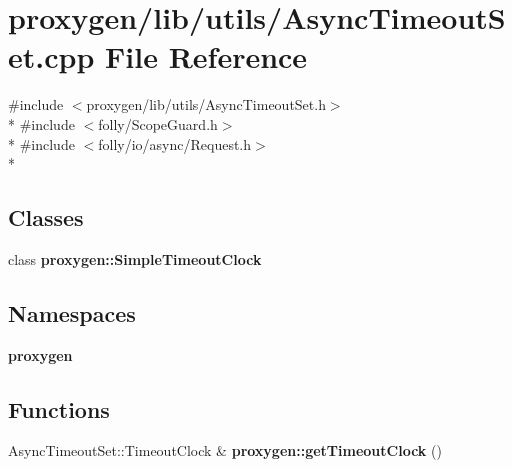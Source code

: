 \section{proxygen/lib/utils/\+Async\+Timeout\+Set.cpp File Reference}
\label{AsyncTimeoutSet_8cpp}
{\ttfamily \#include $<$proxygen/lib/utils/\+Async\+Timeout\+Set.\+h$>$}\\*
{\ttfamily \#include $<$folly/\+Scope\+Guard.\+h$>$}\\*
{\ttfamily \#include $<$folly/io/async/\+Request.\+h$>$}\\*
\subsection*{Classes}
\begin{DoxyCompactItemize}
\item 
class {\bf proxygen\+::\+Simple\+Timeout\+Clock}
\end{DoxyCompactItemize}
\subsection*{Namespaces}
\begin{DoxyCompactItemize}
\item 
 {\bf proxygen}
\end{DoxyCompactItemize}
\subsection*{Functions}
\begin{DoxyCompactItemize}
\item 
Async\+Timeout\+Set\+::\+Timeout\+Clock \& {\bf proxygen\+::get\+Timeout\+Clock} ()
\end{DoxyCompactItemize}
